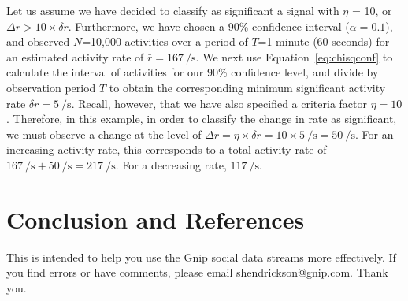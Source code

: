 \documentclass{article}
\begin{document}
%
%


Let us assume we have decided to classify as significant a signal with $\eta$ = 10, or 
$\Delta r > 10\times\delta r$. Furthermore, we have chosen a 90\% confidence interval 
($\alpha = 0.1$), and observed $N$=10,000 activities over a period of $T$=1 minute 
(60 seconds) for an estimated activity rate of $\bar r = 167~\si{\per\second}$. We next use 
Equation~\ref{eq:chisqconf} to calculate the interval of activities for our 
90\% confidence level, and divide by observation period $T$ to obtain the corresponding 
minimum significant activity rate $\delta r = 5~\si{\per\second}$. Recall, however, 
that we have also specified a criteria factor $\eta = 10$. Therefore, in this example, 
in order to classify the change in rate as significant, we must observe a change at the 
level of 
$\Delta r = \eta \times \delta r = 10 \times 5~\si{\per\second} = 50~\si{\per\second}$. 
For an increasing activity rate, this corresponds to a total activity rate of 
$167~\si{\per\second} + 50~\si{\per\second} = 217~\si{\per\second}$. For a decreasing 
rate, $117~\si{\per\second}$.







\section{Conclusion and References} %

This is intended to help you use the Gnip social data streams more effectively.  If you find errors or have comments, please email shendrickson@gnip.com. Thank you.
\end{document}
